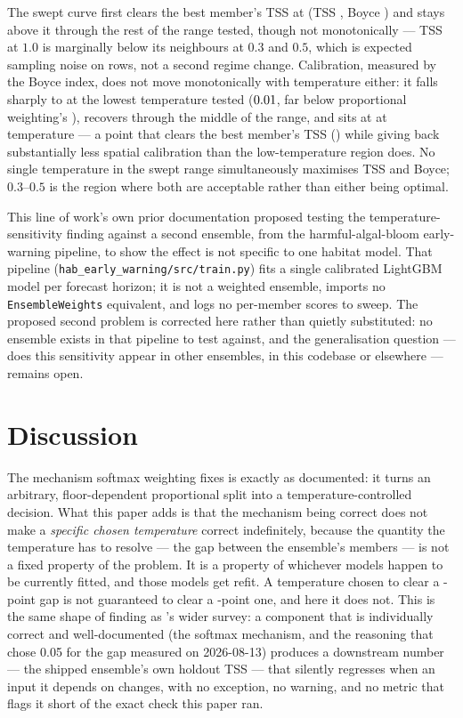  The swept curve first clears the best member's TSS at
\FirstClearingTemp{} (TSS \FirstClearingTSS{}, Boyce \FirstClearingBoyce{})
and stays above it through the rest of the range tested, though not
monotonically --- TSS at \(1.0\) is marginally below its neighbours at
\(0.3\) and \(0.5\), which is expected sampling noise on \NHoldout{} rows,
not a second regime change. Calibration, measured by the Boyce index, does
not move monotonically with temperature either: it falls sharply to
\LowBoyce{} at the lowest temperature tested (\(0.01{}\), far below
proportional weighting's \CurPropBoyce{}), recovers through the middle of
the range, and sits at \MidBoyce{} at temperature \MidTemp{} --- a point
that clears the best member's TSS (\MidTSS{}) while giving back
substantially less spatial calibration than the low-temperature region
does. No single temperature in the swept range simultaneously maximises
TSS and Boyce; \(0.3\)--\(0.5\) is the region where both are acceptable
rather than either being optimal.

 This line of
work's own prior documentation proposed testing the temperature-sensitivity
finding against a second ensemble, from the harmful-algal-bloom
early-warning pipeline, to show the effect is not specific to one habitat
model. That pipeline (\texttt{hab\_early\_warning/src/\allowbreak{}train.py})
fits a
single calibrated LightGBM model per forecast horizon; it is not a weighted
ensemble, imports no \texttt{EnsembleWeights} equivalent, and logs no
per-member scores to sweep. The proposed second problem is corrected here
rather than quietly substituted: no ensemble exists in that pipeline to
test against, and the generalisation question --- does this sensitivity
appear in other ensembles, in this codebase or elsewhere --- remains open.

\section{Discussion}

The mechanism softmax weighting fixes is exactly as documented: it turns an
arbitrary, floor-dependent proportional split into a temperature-controlled
decision. What this paper adds is that the mechanism being correct does not
make a \emph{specific chosen temperature} correct indefinitely, because the
quantity the temperature has to resolve --- the gap between the ensemble's
members --- is not a fixed property of the problem. It is a property of
whichever models happen to be currently fitted, and those models get
refit. A temperature chosen to clear a \HistGap{}-point gap is not
guaranteed to clear a \CurGap{}-point one, and here it does not. This is
the same shape of finding as \citep{silentfailures2026}'s wider survey: a
component that is individually correct and well-documented (the softmax
mechanism, and the reasoning that chose 0.05 for the gap measured on
2026-08-13) produces a downstream number --- the shipped ensemble's own
holdout TSS --- that silently regresses when an input it depends on
changes, with no exception, no warning, and no metric that flags it short
of the exact check this paper ran.

